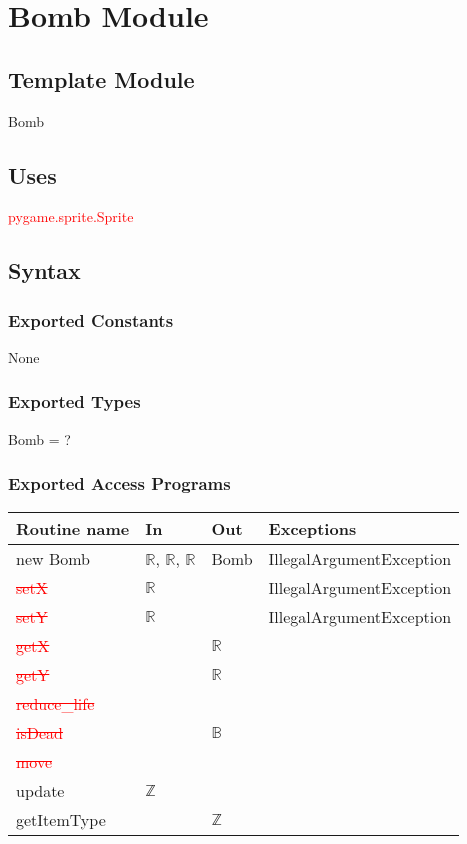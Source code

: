 \documentclass[12pt]{article}
\begin{document}
\newpage

\section{Bomb Module}

\subsection*{Template Module}
Bomb

\subsection*{Uses}
\textcolor{red}{pygame.sprite.Sprite}

\subsection*{Syntax}
\subsubsection*{Exported Constants}
None
\subsubsection*{Exported Types}
Bomb = ?
\subsubsection*{Exported Access Programs}
\begin{tabular}{| l | l | l | p{5cm} |}
\hline
\textbf{Routine name} & \textbf{In} & \textbf{Out} & \textbf{Exceptions}\\
\hline
new Bomb & $\mathbb{R}$, $\mathbb{R}$, $\mathbb{R}$ & Bomb & IllegalArgumentException\\
\hline
\textcolor{red}{\st{setX}} & $\mathbb{R}$ &  & IllegalArgumentException\\
\hline
\textcolor{red}{\st{setY}} & $\mathbb{R}$ &  & IllegalArgumentException\\
\hline
\textcolor{red}{\st{getX }}&    & $\mathbb{R}$ & \\
\hline
\textcolor{red}{\st{getY}} &    & $\mathbb{R}$ & \\
\hline
\textcolor{red}{\st{reduce\_life}} & & & \\
\hline
\textcolor{red}{\st{isDead}} & & $\mathbb{B}$ & \\
\hline
\textcolor{red}{\st{move}} & & &\\
\hline
update & $\mathbb{Z}$ &&\\
\hline
getItemType &&$\mathbb{Z}$&\\
\hline
\end{tabular}
\end{document}
